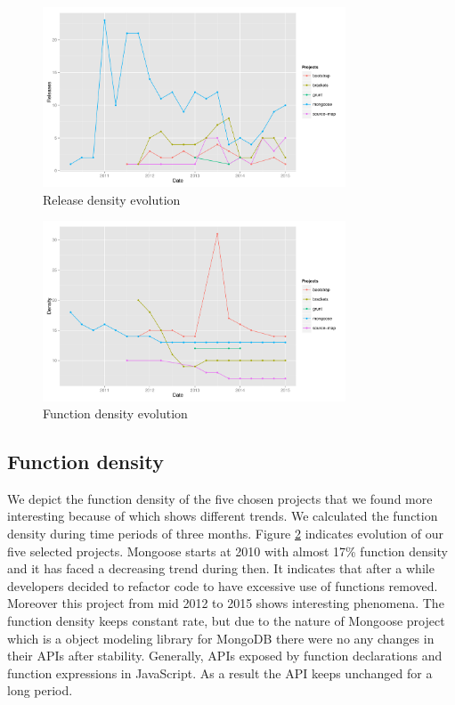 \begin{figure}[thb!]
	\caption{Release density evolution}
	\label{fig:release_density}
	\includegraphics[width=90mm,scale=0.5]{figures/release_density}
\end{figure}





 \begin{figure}[thb!]
 	\caption{Function density evolution}
 	\label{fig:function_density}
 	\includegraphics[width=90mm,scale=0.5]{figures/function_density}
 \end{figure}


\subsection{Function density}
We depict the function density of the five chosen projects that we found more interesting because of which shows different trends. We calculated the function density during time periods of three months.
Figure \ref{fig:function_density} indicates evolution of our five selected projects. Mongoose starts at 2010 with almost 17\% function density and it has faced a decreasing trend during then. It indicates that after a while developers decided to refactor code to have  excessive use of functions removed. Moreover this project from mid 2012 to 2015 shows interesting phenomena. The function density keeps constant rate, but due to the nature of Mongoose project which is a object modeling library for MongoDB there were no any changes in their APIs after stability. Generally, APIs exposed by function declarations and function expressions in JavaScript. As a result the API keeps unchanged for a long period. 

